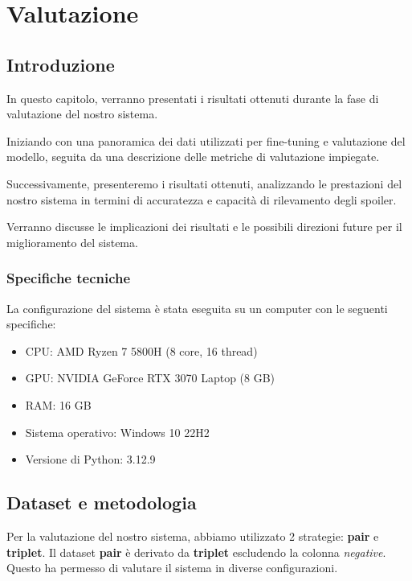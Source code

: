 \chapter{Valutazione}
\label{ch:valutazione}

\section{Introduzione}
\label{sec:introduzione}
In questo capitolo, verranno presentati i risultati
ottenuti durante la fase di valutazione del nostro sistema.

Iniziando con una panoramica dei dati utilizzati per
fine-tuning e valutazione del modello, seguita da una
descrizione delle metriche di valutazione impiegate.

Successivamente, presenteremo i risultati ottenuti,
analizzando le prestazioni del nostro sistema in termini di
accuratezza e capacità di rilevamento degli spoiler.

Verranno discusse le implicazioni dei risultati e le
possibili direzioni future per il miglioramento del
sistema.

\subsection{Specifiche tecniche}
\label{sec:specs}
La configurazione del sistema è stata eseguita su un
computer con le seguenti specifiche:

\begin{itemize}
  \item CPU: AMD Ryzen 7 5800H (8 core, 16 thread)
  \item GPU: NVIDIA GeForce RTX 3070 Laptop (8 GB)
  \item RAM: 16 GB
  \item Sistema operativo: Windows 10 22H2
  \item Versione di Python: 3.12.9
\end{itemize}

\section{Dataset e metodologia}
\label{sec:dataset_eval}

Per la valutazione del nostro sistema, abbiamo utilizzato 2
strategie: \textbf{pair} e \textbf{triplet}.
Il dataset \textbf{pair} è derivato da \textbf{triplet}
escludendo la colonna \textit{negative}.
Questo ha permesso di valutare il sistema in diverse
configurazioni.

